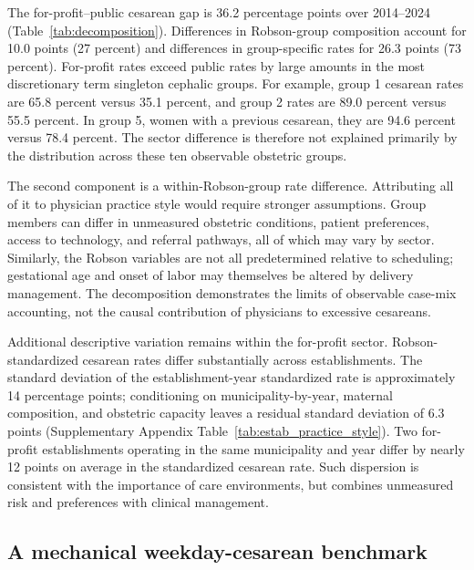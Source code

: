 \documentclass[12pt]{article}
\newcommand{\satab}[1]{Supplementary Appendix Table~\ref{#1}}
\begin{document}
The for-profit--public cesarean gap is 36.2 percentage points over 2014--2024 (Table~\ref{tab:decomposition}). Differences in Robson-group composition account for 10.0 points (27 percent) and differences in group-specific rates for 26.3 points (73 percent). For-profit rates exceed public rates by large amounts in the most discretionary term singleton cephalic groups. For example, group 1 cesarean rates are 65.8 percent versus 35.1 percent, and group 2 rates are 89.0 percent versus 55.5 percent. In group 5, women with a previous cesarean, they are 94.6 percent versus 78.4 percent. The sector difference is therefore not explained primarily by the distribution across these ten observable obstetric groups.

The second component is a within-Robson-group rate difference. Attributing all of it to physician practice style would require stronger assumptions. Group members can differ in unmeasured obstetric conditions, patient preferences, access to technology, and referral pathways, all of which may vary by sector. Similarly, the Robson variables are not all predetermined relative to scheduling; gestational age and onset of labor may themselves be altered by delivery management. The decomposition demonstrates the limits of observable case-mix accounting, not the causal contribution of physicians to excessive cesareans.

Additional descriptive variation remains within the for-profit sector. Robson-standardized cesarean rates differ substantially across establishments. The standard deviation of the establishment-year standardized rate is approximately 14 percentage points; conditioning on municipality-by-year, maternal composition, and obstetric capacity leaves a residual standard deviation of 6.3 points (\satab{tab:estab_practice_style}). Two for-profit establishments operating in the same municipality and year differ by nearly 12 points on average in the standardized cesarean rate. Such dispersion is consistent with the importance of care environments, but combines unmeasured risk and preferences with clinical management.



\subsection{A mechanical weekday-cesarean benchmark}
\end{document}
